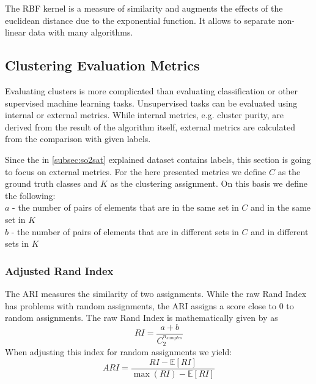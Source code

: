 The RBF kernel is a measure of similarity and augments the effects of the euclidean distance due to the exponential function.
It allows to separate non-linear data with many algorithms.


\subsection{Clustering Evaluation Metrics}
\label{subsec:clustering_evaluation_metrics}

Evaluating clusters is more complicated than evaluating classification or other supervised machine learning tasks.
Unsupervised tasks can be evaluated using internal or external metrics.
While internal metrics, e.g. cluster purity, are derived from the result of the algorithm itself, external metrics are calculated from the comparison with given labels.

Since the in \cref{subsec:so2sat} explained dataset contains labels, this section is going to focus on external metrics.
For the here presented metrics we define \(C\) as the ground truth classes and \(K\) as the clustering assignment.
On this basis we define the following:\\
\(a\) - the number of pairs of elements that are in the same set in \(C\) and in the same set in \(K\)\\
\(b\) - the number of pairs of elements that are in different sets in \(C\) and in different sets in \(K\)\\


\subsubsection{Adjusted Rand Index}
The \gls{ARI} measures the similarity of two assignments. While the raw Rand Index has problems with random assignments, the \gls{ARI} assigns a score close to \(0\)
to random assignments.
The raw Rand Index is mathematically given by \cite{noauthor_23_2020} as
\[RI = \frac{a + b}{C_2^{n_{samples}}}\]
When adjusting this index for random assignments we yield:
\[ARI = \frac{RI - \mathbb{E} [RI]}{\max (RI) - \mathbb{E} [RI]}\]


